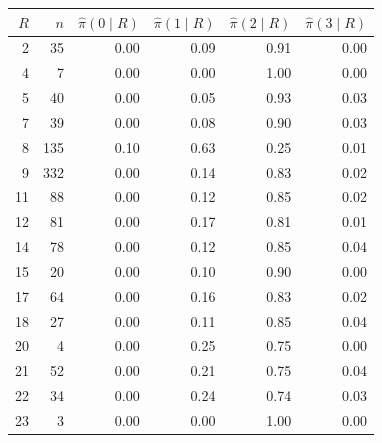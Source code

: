 \begin{tabular}{rrrrrr}
\toprule
$R$ & $n$ & $\hat\pi(0\mid R)$ & $\hat\pi(1\mid R)$ & $\hat\pi(2\mid R)$ & $\hat\pi(3\mid R)$ \\
\midrule
2 & 35 & 0.00 & 0.09 & 0.91 & 0.00 \\
4 & 7 & 0.00 & 0.00 & 1.00 & 0.00 \\
5 & 40 & 0.00 & 0.05 & 0.93 & 0.03 \\
7 & 39 & 0.00 & 0.08 & 0.90 & 0.03 \\
8 & 135 & 0.10 & 0.63 & 0.25 & 0.01 \\
9 & 332 & 0.00 & 0.14 & 0.83 & 0.02 \\
11 & 88 & 0.00 & 0.12 & 0.85 & 0.02 \\
12 & 81 & 0.00 & 0.17 & 0.81 & 0.01 \\
14 & 78 & 0.00 & 0.12 & 0.85 & 0.04 \\
15 & 20 & 0.00 & 0.10 & 0.90 & 0.00 \\
17 & 64 & 0.00 & 0.16 & 0.83 & 0.02 \\
18 & 27 & 0.00 & 0.11 & 0.85 & 0.04 \\
20 & 4 & 0.00 & 0.25 & 0.75 & 0.00 \\
21 & 52 & 0.00 & 0.21 & 0.75 & 0.04 \\
22 & 34 & 0.00 & 0.24 & 0.74 & 0.03 \\
23 & 3 & 0.00 & 0.00 & 1.00 & 0.00 \\
\bottomrule
\end{tabular}
